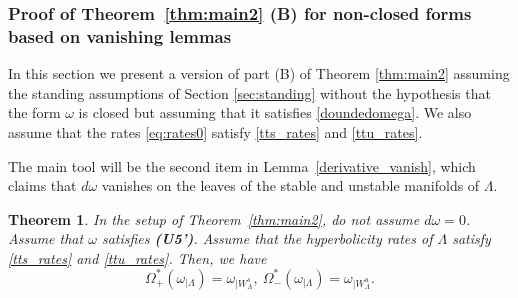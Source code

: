 \documentclass[11pt]{amsart}
\newtheorem{thm}{Theorem}[section]
\theoremstyle{definition}
\theoremstyle{remark}
\numberwithin{equation}{section}
\begin{document}
\subsubsection{Proof of Theorem~\ref{thm:main2}  (B) for non-closed
  forms based on vanishing lemmas}\label{proofnonclosed}

In this section we present a version of part (B) of Theorem \ref{thm:main2} assuming the standing assumptions  of Section \ref{sec:standing}  without the hypothesis that the form $\omega$ is  closed but assuming  that it satisfies  \eqref{doundedomega}.
We also assume that the rates \eqref{eq:rates0}
satisfy
\eqref{tts_rates} and  \eqref{ttu_rates}.

The main tool will be the second item in  Lemma~\ref{derivative_vanish}, which claims that $d\omega$ vanishes on the leaves of the stable and unstable manifolds of $\Lambda$.


\begin{thm}\label{thm:mainvanishder}
  In the setup of Theorem~\ref{thm:main2}, do not assume   $d\omega = 0$.
  Assume that
$\omega$ satisfies {\textbf{(U5')}}.
  Assume that the hyperbolicity rates of $\Lambda$
  satisfy \eqref{tts_rates} and  \eqref{ttu_rates}.
  Then, we have
  \[
  \Omega_+^* (\omega_{\mid\Lambda}) = \omega_{\mid W^s_\Lambda}, \
  \Omega_-^* (\omega_{\mid\Lambda})  = \omega_{\mid W^u_\Lambda}.
  \]
\end{thm}
\end{document}
